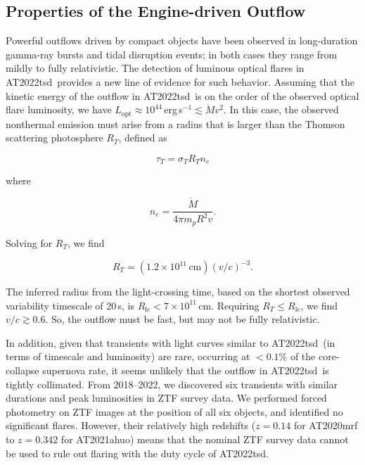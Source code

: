\documentclass{nature_plusfigure}
\newcommand{\at}{AT2022tsd}
\begin{document}
\begin{methods}
\section{Properties of the Engine-driven Outflow}
\label{sec:outflow-velocity}

Powerful outflows driven by compact objects have been observed in long-duration gamma-ray bursts and tidal disruption events; in both cases they range from mildly to fully relativistic. The detection of luminous optical flares in \at\ provides a new line of evidence for such behavior. Assuming that the kinetic energy of the outflow in \at\ is on the order of the observed optical flare luminosity, we have $L_\mathrm{opt} \approx 10^{44}\,$erg\,s$^{-1} \lesssim \dot{M}v^2$. In this case, the observed nonthermal emission must arise from a radius that is larger than the Thomson scattering photosphere $R_T$, defined as

\begin{equation}
    \tau_T = \sigma_T R_T n_e
\end{equation}

\noindent where 

\begin{equation}
    n_e = \frac{\dot{M}}{4\pi m_p R^2 v}.
\end{equation}

\noindent Solving for $R_T$, we find

\begin{equation}
    R_T = (1.2 \times 10^{11}\,\mathrm{cm}) (v/c)^{-3}.
\end{equation}

The inferred radius from the light-crossing time, based on the shortest observed variability timescale of 20\,s, is $R_\mathrm{lc} < 7\times10^{11}\,$cm. Requiring $R_T \leq R_\mathrm{lc}$, we find $v/c \gtrsim 0.6$. So, the outflow must be fast, but may not be fully relativistic.

In addition, given that transients with light curves similar to \at\ (in terms of timescale and luminosity) are rare, occurring at $<0.1\%$ of the core-collapse supernova rate\cite{Ho2022_RET}, it seems unlikely that the outflow in \at\ is tightly collimated. From 2018--2022, we discovered six transients with similar durations and peak luminosities in ZTF survey data. We performed forced photometry on ZTF images at the position of all six objects, and identified no significant flares. 
However, their relatively high redshifts ($z=0.14$ for AT2020mrf\cite{Yao2022} to $z=0.342$ for AT2021ahuo) means that the nominal ZTF survey data cannot be used to rule out flaring with the duty cycle of \at.


\end{methods}
\end{document}
